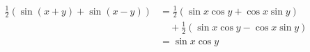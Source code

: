 \begin{equation}\label{eq:trigonometric}
\begin{split}
\frac12 (\sin(x+y) + \sin(x-y))
  &= \frac12(\sin x\cos y + \cos x\sin y) \\
  &\quad + \frac12(\sin x\cos y - \cos x\sin y) \\
  &= \sin x\cos y
\end{split}
\end{equation}
